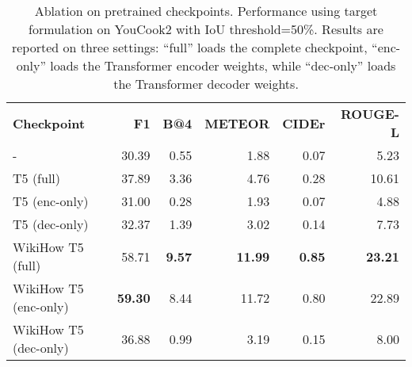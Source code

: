 \documentclass[11pt]{article}
\begin{document}
\begin{table*}[tbp]
\begin{adjustbox}{width=0.6\linewidth,center}
\begin{tabular}{l | r r r r r }
\cmidrule[\heavyrulewidth]{1-6}
\textbf{Checkpoint}  &   \textbf{F1}  &   \textbf{B@4}    &   \textbf{METEOR}  &   \textbf{CIDEr}   &   \textbf{ROUGE-L} \\ 
\cmidrule[\heavyrulewidth]{1-6}

-                       &  30.39  & 0.55  & 1.88  & 0.07  & 5.23 \\
\cmidrule{1-6}

T5 (full)               &  37.89 & 3.36    & 4.76    & 0.28    & 10.61 \\
T5 (enc-only)           &  31.00    & 0.28    & 1.93    & 0.07    & 4.88 \\
T5 (dec-only)           &  32.37    & 1.39    & 3.02    & 0.14    & 7.73    \\
\cmidrule{1-6}

WikiHow T5 (full)       &  58.71    & \textbf{9.57}    & \textbf{11.99}   & \textbf{0.85}    & \textbf{23.21} \\
WikiHow T5 (enc-only)   &  \textbf{59.30}    & 8.44    & 11.72    & 0.80    & 22.89 \\
WikiHow T5 (dec-only)   &  36.88    & 0.99    & 3.19    & 0.15    & 8.00 \\

\cmidrule[\heavyrulewidth]{1-6}
\end{tabular}
\end{adjustbox}
\caption{Ablation on pretrained checkpoints.  Performance using \offsetbased target formulation on YouCook2 \partitiontask with IoU threshold=50\%. Results are reported on three settings: ``full'' loads the complete checkpoint,  ``enc-only'' loads the Transformer encoder weights, while ``dec-only'' loads the Transformer decoder weights.}
\label{tab:ablation_t5_ckpt}
\end{table*}
\end{document}
